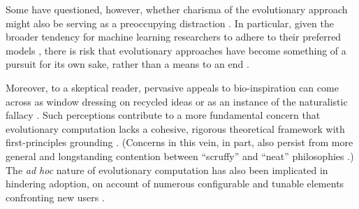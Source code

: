 Some have questioned, however, whether charisma of the evolutionary approach might also be serving as a preoccupying distraction \citep{moore2023evolution,sorensen2015metaheuristics}.
In particular, given the broader tendency for machine learning researchers to adhere to their preferred models \citep{domingos2012few}, there is risk that evolutionary approaches have become something of a pursuit for its own sake, rather than a means to an end \citep{woodward2016gp,yampolskiy2018we}.


Moreover, to a skeptical reader, pervasive appeals to bio-inspiration can come across as window dressing on recycled ideas or as an instance of the naturalistic fallacy \citep{wortmann2020does,sorensen2015metaheuristics}.
Such perceptions contribute to a more fundamental concern that evolutionary computation lacks a cohesive, rigorous theoretical framework with first-principles grounding \citep{worzel2003genetic}.
(Concerns in this vein, in part, also persist from more general and longstanding contention between ``scruffy'' and ``neat'' philosophies \citep[p.~16]{jones2008artificial, minsky1991logical}.)
The \textit{ad hoc} nature of evolutionary computation has also been implicated in hindering adoption, on account of numerous configurable and tunable elements confronting new users \citep{oneil2010open}.

